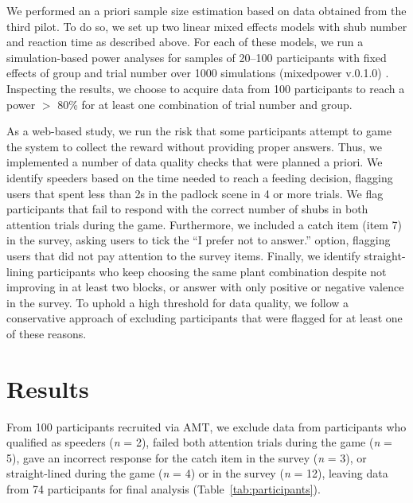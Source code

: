 We performed an a priori sample size estimation based on data obtained from the third pilot. 
To do so, we set up two linear mixed effects models with shub number and reaction time as described above. 
For each of these models, we run a simulation-based power analyses for samples of 20--100 participants with fixed effects of group and trial number over 1000 simulations (mixedpower v.0.1.0) \citep{kumle_estimating_2021}. 
Inspecting the results, we choose to acquire data from 100 participants to reach a power $>$ 80\% for at least one combination of trial number and group.

As a web-based study, we run the risk that some participants attempt to game the system to collect the reward without providing proper answers. 
Thus, we implemented a number of data quality checks that were planned a priori.
We identify speeders based on the time needed to reach a feeding decision, flagging users that spent less than 2s in the padlock scene in 4 or more trials.
We flag participants that fail to respond with the correct number of shubs in both attention trials during the game.
Furthermore, we included a catch item (item 7) in the survey, asking users to tick the ``I prefer not to answer.'' option, flagging users that did not pay attention to the survey items.
Finally, we identify straight-lining participants who keep choosing the same plant combination despite not improving in at least two blocks, or answer with only positive or negative valence in the survey.
To uphold a high threshold for data quality, we follow a conservative approach of excluding participants that were flagged for at least one of these reasons.

\section{Results}\label{sec:results}

From 100 participants recruited via \gls{AMT}, we exclude data from participants who qualified as speeders (\textit{n} = 2), failed both attention trials during the game (\textit{n} = 5), gave an incorrect response for the catch item in the survey (\textit{n} = 3), or straight-lined during the game (\textit{n} = 4) or in the survey (\textit{n} = 12), leaving data from 74 participants for final analysis (Table~\ref{tab:participants}).

